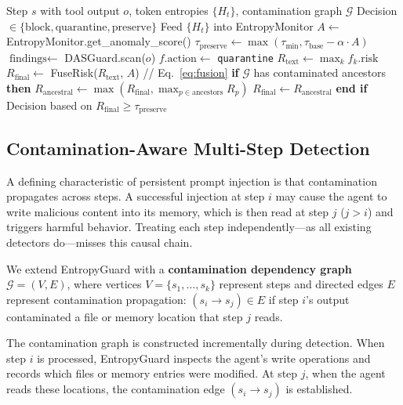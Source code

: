 \documentclass[conference]{IEEEtran}
\begin{document}
\begin{algorithm}[t]
\small
\caption{EntropyGuard Per-Step Detection}
\label{alg:entropyguard}
\begin{algorithmic}[1]
\REQUIRE Step $s$ with tool output $o$, token entropies $\{H_t\}$, contamination graph $\mathcal{G}$
\ENSURE Decision $\in \{\text{block}, \text{quarantine}, \text{preserve}\}$
\STATE Feed $\{H_t\}$ into EntropyMonitor
\STATE $A \leftarrow$ EntropyMonitor.get\_anomaly\_score()
\STATE $\tau_{\text{preserve}} \leftarrow \max(\tau_{\min}, \tau_{\text{base}} - \alpha \cdot A)$
\STATE $\text{findings} \leftarrow$ DASGuard.scan($o$)
        \STATE $f.\text{action} \leftarrow$ \texttt{quarantine}
    \ENDIF
\ENDFOR
\STATE $R_{\text{text}} \leftarrow \max_k f_k.\text{risk}$
\STATE $R_{\text{final}} \leftarrow$ FuseRisk($R_{\text{text}}$, $A$) \quad // Eq.~\ref{eq:fusion}
\STATE \textbf{if} $\mathcal{G}$ has contaminated ancestors \textbf{then}
\STATE \quad $R_{\text{ancestral}} \leftarrow \max(R_{\text{final}}, \max_{p \in \text{ancestors}} R_p)$
\STATE \quad $R_{\text{final}} \leftarrow R_{\text{ancestral}}$
\STATE \textbf{end if}
\RETURN Decision based on $R_{\text{final}} \geq \tau_{\text{preserve}}$
\end{algorithmic}
\end{algorithm}

\subsection{Contamination-Aware Multi-Step Detection}
\label{sec:contamination}

A defining characteristic of persistent prompt injection is that contamination propagates across steps. A successful injection at step $i$ may cause the agent to write malicious content into its memory, which is then read at step $j$ ($j > i$) and triggers harmful behavior. Treating each step independently---as all existing detectors do---misses this causal chain.

We extend EntropyGuard with a \textbf{contamination dependency graph} $\mathcal{G} = (V, E)$, where vertices $V = \{s_1, \ldots, s_k\}$ represent steps and directed edges $E$ represent contamination propagation: $(s_i \rightarrow s_j) \in E$ if step $i$'s output contaminated a file or memory location that step $j$ reads.

The contamination graph is constructed incrementally during detection. When step $i$ is processed, EntropyGuard inspects the agent's write operations and records which files or memory entries were modified. At step $j$, when the agent reads these locations, the contamination edge $(s_i \rightarrow s_j)$ is established.
\end{document}
